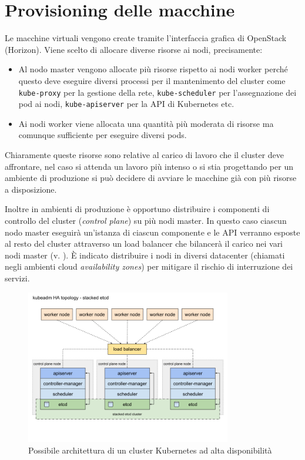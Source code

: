 \documentclass[12pt,a4paper,openright,twoside]{book}
\begin{document}
\section{Provisioning delle macchine}
Le macchine virtuali vengono create tramite l'interfaccia grafica di OpenStack (Horizon). Viene scelto di allocare diverse risorse ai nodi, precisamente: 
\begin{itemize}
    \item Al nodo master vengono allocate più risorse rispetto ai nodi worker perché questo deve eseguire diversi processi per il mantenimento del cluster
        come \texttt{kube-proxy} per la gestione della rete, \texttt{kube-scheduler} per l'assegnazione dei pod ai nodi, \texttt{kube-apiserver} per la API di Kubernetes etc.
    \item Ai nodi worker viene allocata una quantità più moderata di risorse ma comunque sufficiente per eseguire diversi pods. 
\end{itemize}
Chiaramente queste risorse sono relative al carico di lavoro che il cluster deve affrontare, nel caso si attenda un lavoro più intenso o si stia progettando per un ambiente di produzione
si può decidere di avviare le macchine già con più risorse a disposizione.

Inoltre in ambienti di produzione è opportuno distribuire i componenti di controllo del cluster (\textit{control plane}) su più nodi master. In questo caso ciascun nodo master eseguirà un'istanza
di ciascun componente e le API verranno esposte al resto del cluster attraverso un load balancer che bilancerà il carico nei vari nodi master (v. ). È indicato distribuire i nodi in diversi datacenter 
(chiamati negli ambienti cloud \textit{availability zones}) per mitigare il rischio di interruzione dei servizi\cite{kubernetes}.
%
\begin{figure}[!hbt]
    \centering
    \includegraphics[width=0.8\textwidth]{figures/kube-ha-topo.png}
    \caption{Possibile architettura di un cluster Kubernetes ad alta disponibilità}
    \label{fig:kube-ha-topo}
\end{figure}
%
\end{document}
